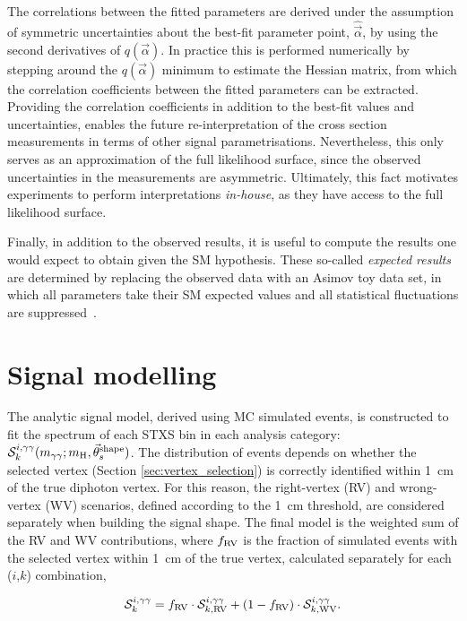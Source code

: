The correlations between the fitted parameters are derived under the assumption of symmetric uncertainties about the best-fit parameter point, $\hat{\vec{\alpha}}$, by using the second derivatives of $q(\vec{\alpha})$. In practice this is performed numerically by stepping around the $q(\vec{\alpha})$ minimum to estimate the Hessian matrix, from which the correlation coefficients between the fitted parameters can be extracted. Providing the correlation coefficients in addition to the best-fit values and uncertainties, enables the future re-interpretation of the cross section measurements in terms of other signal parametrisations. Nevertheless, this only serves as an approximation of the full likelihood surface, since the observed uncertainties in the measurements are asymmetric. Ultimately, this fact motivates experiments to perform interpretations \textit{in-house}, as they have access to the full likelihood surface.

Finally, in addition to the observed results, it is useful to compute the results one would expect to obtain given the SM hypothesis. These so-called \textit{expected results} are determined by replacing the observed data with an Asimov toy data set, in which all parameters take their SM expected values and all statistical fluctuations are suppressed~\cite{Cowan:2010js}.


\section{Signal modelling}\label{sec:sig_modelling}
The analytic signal model, derived using MC simulated events, is constructed to fit the \mgg spectrum of each STXS bin in each analysis category: $\mathcal{S}^{i,\gamma\gamma}_k(m_{\gamma\gamma};m_{\rm{H}},\vec{\theta}^{\rm{shape}}_s)$. The distribution of events depends on whether the selected vertex (Section \ref{sec:vertex_selection}) is correctly identified within 1~cm of the true diphoton vertex. For this reason, the right-vertex (RV) and wrong-vertex (WV) scenarios, defined according to the 1~cm threshold, are considered separately when building the signal shape. The final model is the weighted sum of the RV and WV contributions, where $f_{{\rm{RV}}}$ is the fraction of simulated events with the selected vertex within 1~cm of the true vertex, calculated separately for each ($i$,$k$) combination,

\begin{equation}
    \mathcal{S}^{i,\gamma\gamma}_k = f_{{\rm{RV}}} \cdot \mathcal{S}^{i,\gamma\gamma}_{k,{\rm{RV}}} + (1-f_{{\rm{RV}}}) \cdot\mathcal{S}^{i,\gamma\gamma}_{k,{\rm{WV}}}.
\end{equation}

